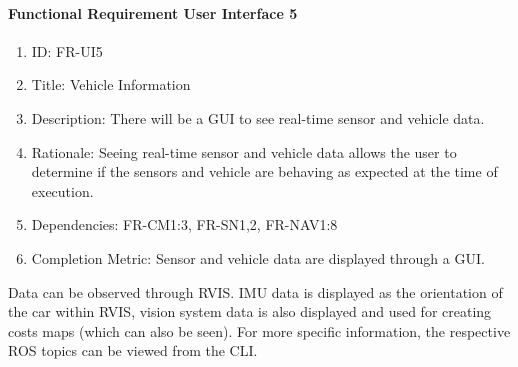 \documentclass[compsoc,draftclsnofoot,onecolumn,10pt]{IEEEtran}
\begin{document}
	\paragraph{\textbf{Functional Requirement User Interface 5}}
		\begin{enumerate}
			\item ID: FR-UI5
			\item Title: Vehicle Information
			\item Description: There will be a GUI to see real-time sensor and vehicle data.
			\item Rationale: Seeing real-time sensor and vehicle data allows the user to determine if the sensors and vehicle are behaving as expected at the time of execution.
			\item Dependencies: FR-CM1:3, FR-SN1,2, FR-NAV1:8
			\item Completion Metric: Sensor and vehicle data are displayed through a GUI.
		\end{enumerate}
	Data can be observed through RVIS. IMU data is displayed as the orientation of the car within RVIS, vision system data is also displayed and used for creating costs maps (which can also be seen). For more specific information, the respective ROS topics can be viewed from the CLI. 
\end{document}
